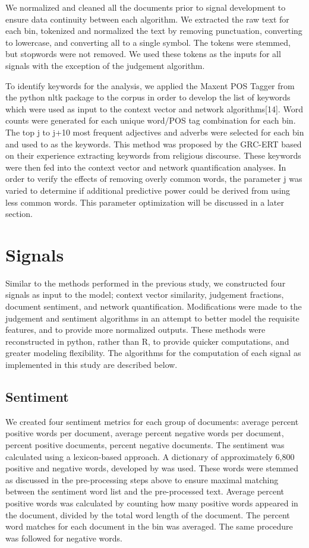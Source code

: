 \documentclass[11pt]{article}
\begin{document}
We normalized and cleaned all the documents prior to signal development to ensure data continuity between each algorithm. We extracted the raw text for each bin, tokenized and normalized the text by removing punctuation, converting to lowercase, and converting all to a single symbol. The tokens were stemmed, but stopwords were not removed. We used these tokens as the inputs for all signals with the exception of the judgement algorithm.

To identify keywords for the analysis, we applied the Maxent POS Tagger from the python nltk package  to the corpus in order to develop the list of keywords which were used as input to the context vector and network algorithms[14]. Word counts were generated for each unique word/POS tag combination for each bin. The top j to j+10 most frequent adjectives and adverbs were selected for each bin and used to as the keywords. This method was proposed by the GRC-ERT based on their experience extracting keywords from religious discourse. These keywords were then fed into the context vector and network quantification analyses. In order to verify the effects of removing overly common words, the parameter j was varied to determine if additional predictive power could be derived from using less common words. This parameter optimization will be discussed in a later section.

\section{Signals}

Similar to the methods performed in the previous study, we constructed four signals as input to the model; context vector similarity, judgement fractions, document sentiment, and network quantification. Modifications were made to the judgement and sentiment algorithms in an attempt to better model the requisite features, and to provide more normalized outputs. These methods were reconstructed in python, rather than R, to provide quicker computations, and greater modeling flexibility. The algorithms for the computation of each signal as implemented in this study are described below.

\subsection{Sentiment}

We created four sentiment metrics for each group of documents: average percent positive words per document, average percent negative words per document, percent positive documents, percent negative documents. The sentiment was calculated using a lexicon-based approach. A dictionary of approximately 6,800 positive and negative words, developed by  was used. These words were stemmed as discussed in the pre-processing steps above to ensure maximal matching between the sentiment word list and the pre-processed text. Average percent positive words was calculated by counting how many positive words appeared in the document, divided by the total word length of the document. The percent word matches for each document in the bin was averaged. The same procedure was followed for negative words. 
\end{document}
